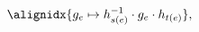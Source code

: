 \begin{equation}
\label{eq_localgauge}
  \alignidx{g_e \mapsto h_{s(e)}^{-1}\cdot g_e\cdot h_{t(e)}},
\end{equation}

